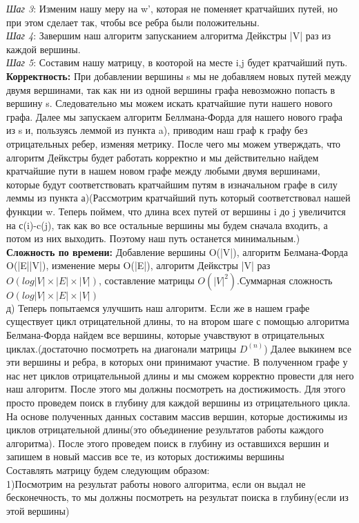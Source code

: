\documentclass[a4paper,12pt]{article}
\begin{document}
\textsl{ Шаг 3}: Изменим нашу меру на w', которая не поменяет кратчайших путей, но при этом сделает так, чтобы все ребра были положительны.\\
\textsl{ Шаг 4}:  Завершим наш алгоритм запусканием алгоритма Дейкстры |V| раз из каждой вершины. \\
\textsl{Шаг 5}: Составим нашу матрицу, в кооторой на месте i,j будет кратчайший путь.\\
\textbf{Корректность:} При добавлении вершины s мы не добавляем новых путей между двумя вершинами, так как ни из одной вершины графа невозможно попасть в вершину s. Следовательно мы можем искать кратчайшие пути нашего нового графа. Далее мы запускаем алгоритм Беллмана-Форда для нашего нового графа из s и, пользуясь леммой из пункта a), приводим наш граф к графу без отрицательных ребер, изменяя метрику. После чего мы можем утверждать, что алгоритм Дейкстры будет работать корректно и мы действительно найдем кратчайшие пути в нашем новом графе между любыми двумя вершинами, которые будут соответствовать кратчайшим путям в изначальном графе в силу леммы из пункта а)(Рассмотрим кратчайший путь который соответствовал нашей функции w. Теперь поймем, что длина всех путей от вершины i до j увеличится на с(i)-c(j), так как во все остальные вершины мы будем сначала входить, а потом из них выходить. Поэтому наш путь останется минимальным.)\\
\textbf{Сложность по времени:} Добавление вершины O(|V|), алгоритм Белмана-Форда O(|E||V|), изменение меры O(|E|), алгоритм Дейкстры |V| раз $O(log |V| \times |E| \times |V|)$, составление матрицы $O(|V|^2)$.Суммарная сложность $O(log |V| \times |E| \times |V|)$\\
д) Теперь попытаемся улучшить наш алгоритм. Если же в нашем графе существует цикл отрицательной длины, то на втором шаге с помощью алгоритма Белмана-Форда найдем все вершины, которые учавствуют в отрицательных циклах.(достаточно посмотреть на диагонали матрицы $D^{(n)}$) Далее выкинем все эти вершины и ребра, в которых они принимают участие. В полученном графе у нас нет циклов отрицательныой длины и мы сможем корректно провести для него наш алгоритм. После этого мы должны посмотреть на достижимость. Для этого просто проведем поиск в глубину для каждой вершины из отрицательного цикла. На основе полученных данных составим массив вершин, которые достижимы из циклов отрицательной длины(это объединение результатов работы каждого алгоритма). После этого проведем поиск в глубину из оставшихся вершин и запишем в новый массив все те, из которых достижимы вершины \\
Составлять матрицу будем следующим образом: \\
1)Посмотрим на результат работы нового алгоритма, если он выдал не бесконечность, то мы должны посмотреть на результат поиска в глубину(если из этой вершины)
\end{document}
